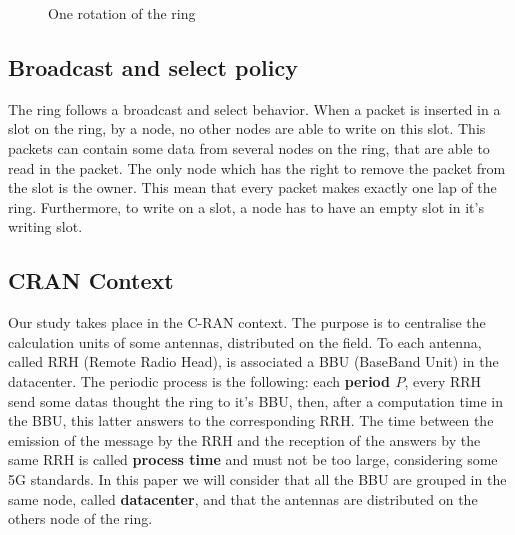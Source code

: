 \documentclass[a4paper,10pt]{article}
\begin{document}
\begin{figure}[h!]
      \caption{One rotation of the ring}
  \end{figure}
  \subsection{Broadcast and select policy}
  The ring follows a broadcast and select behavior. When a packet is inserted in a slot on the ring, by a node, no other nodes are able to write on this slot. This packets can contain some data from several nodes on the ring, that are able to read in the packet. The only node which has the right to remove the packet from the slot is the owner. This mean that every packet makes exactly one lap of the ring. Furthermore, to write on a slot, a node has to have an empty slot in it's writing slot.
  
    \subsection{CRAN Context}
    Our study takes place in the C-RAN context. The purpose is to centralise the calculation units of some antennas, distributed on the field. To each antenna, called RRH (Remote Radio Head), is associated a BBU (BaseBand Unit) in the datacenter.
      The periodic process is the following: each {\bf period $P$}, every RRH send some datas thought the ring to it's BBU, then, after a computation time in the BBU, this latter answers to the corresponding RRH. 
      The time between the emission of the message by the RRH and the reception of the answers by the same RRH is called {\bf process time} and must not be too large, considering some 5G standards.
      In this paper we will consider that all the BBU are grouped in the same node, called {\bf datacenter}, and that the antennas are distributed on the others node of the ring.
  
  
    
\end{document}
